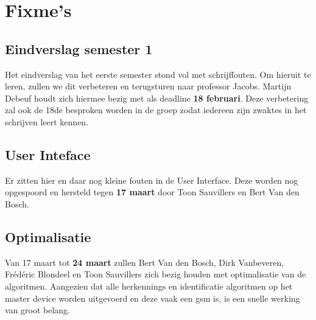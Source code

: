 \documentclass[a4paper,11pt]{article}
\begin{document}
\section{Fixme's}
\subsection{Eindverslag semester 1}
Het eindverslag van het eerste semester stond vol met schrijffouten. Om hieruit te leren, zullen we dit verbeteren en terugsturen naar professor Jacobs. Martijn Debeuf houdt zich hiermee bezig met als deadline {\bf 18 februari}. Deze verbetering zal ook de 18de besproken worden in de groep zodat iedereen zijn zwaktes in het schrijven leert kennen.

\subsection{User Inteface}
Er zitten hier en daar nog kleine fouten in de User Interface. Deze worden nog opgespoord en hersteld tegen {\bf 17 maart} door Toon Sauvillers en Bert Van den Bosch.

\subsection {Optimalisatie}
Van 17 maart tot {\bf 24 maart} zullen Bert Van den Bosch, Dirk Vanbeveren, Frédéric Blondeel en Toon Sauvillers zich bezig houden met optimalisatie van de algoritmen. Aangezien dat alle herkennings en identificatie algoritmen op het master device worden uitgevoerd en deze vaak een gsm is, is een snelle werking van groot belang.
\end{document}
